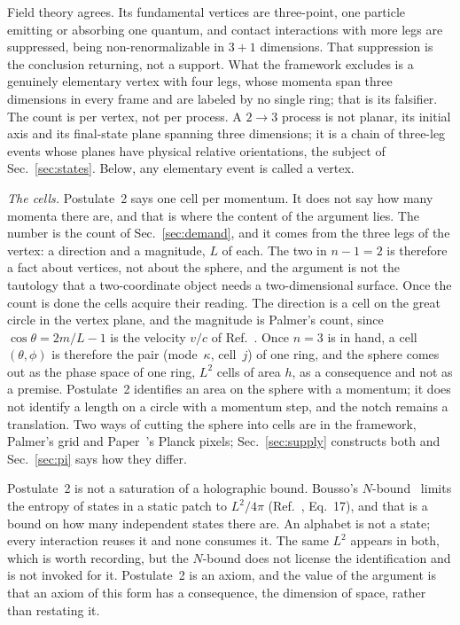 \documentclass[aps,prd,twocolumn,superscriptaddress,nofootinbib]{revtex4-2}
\begin{document}
Field theory agrees. Its fundamental vertices are three-point, one particle emitting or absorbing one quantum, and contact interactions with more legs are suppressed, being non-renormalizable in $3+1$ dimensions. That suppression is the conclusion returning, not a support. What the framework excludes is a genuinely elementary vertex with four legs, whose momenta span three dimensions in every frame and are labeled by no single ring; that is its falsifier. The count is per vertex, not per process. A $2\to3$ process is not planar, its initial axis and its final-state plane spanning three dimensions; it is a chain of three-leg events whose planes have physical relative orientations, the subject of Sec.~\ref{sec:states}. Below, any elementary event is called a vertex.

\textit{The cells.} Postulate~2 says one cell per momentum. It does not say how many momenta there are, and that is where the content of the argument lies. The number is the count of Sec.~\ref{sec:demand}, and it comes from the three legs of the vertex: a direction and a magnitude, $L$ of each. The two in $n-1 = 2$ is therefore a fact about vertices, not about the sphere, and the argument is not the tautology that a two-coordinate object needs a two-dimensional surface. Once the count is done the cells acquire their reading. The direction is a cell on the great circle in the vertex plane, and the magnitude is Palmer's count, since $\cos\theta = 2m/L-1$ is the velocity $v/c$ of Ref.~\cite{korytko2026c}. Once $n = 3$ is in hand, a cell $(\theta,\phi)$ is therefore the pair (mode~$\kappa$, cell~$j$) of one ring, and the sphere comes out as the phase space of one ring, $L^2$ cells of area $h$, as a consequence and not as a premise. Postulate~2 identifies an area on the sphere with a momentum; it does not identify a length on a circle with a momentum step, and the notch remains a translation. Two ways of cutting the sphere into cells are in the framework, Palmer's grid and Paper~\cite{korytko2026}'s Planck pixels; Sec.~\ref{sec:supply} constructs both and Sec.~\ref{sec:pi} says how they differ.

Postulate~2 is not a saturation of a holographic bound. Bousso's $N$-bound~\cite{bousso2000} limits the entropy of states in a static patch to $L^2/4\pi$ (Ref.~\cite{korytko2026c}, Eq.~17), and that is a bound on how many independent states there are. An alphabet is not a state; every interaction reuses it and none consumes it. The same $L^2$ appears in both, which is worth recording, but the $N$-bound does not license the identification and is not invoked for it. Postulate~2 is an axiom, and the value of the argument is that an axiom of this form has a consequence, the dimension of space, rather than restating it.
\end{document}
